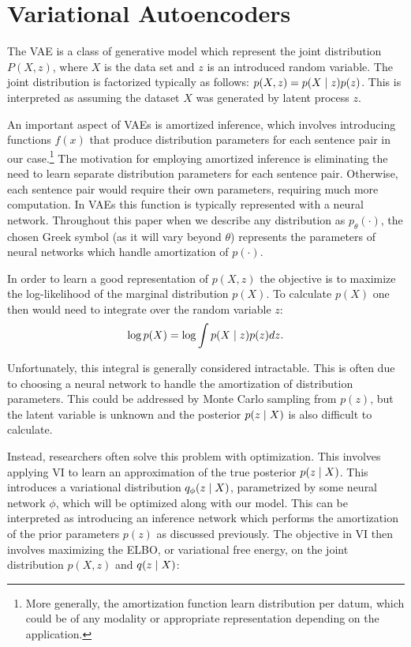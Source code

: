 \section{Variational Autoencoders}

The \ac{VAE} is a class of generative model which represent the joint distribution $P(X, z)$, where $X$ is the data set and $z$ is an introduced random variable. The joint distribution is factorized typically as follows: $p(X, z) = p(X\; | \;{z})p(z)$. This is interpreted as assuming the dataset $X$ was generated by latent process  $z$. 

An important aspect of \ac{VAE}s is amortized inference, which involves introducing functions $f(x)$ that produce distribution parameters for each sentence pair in our case.\footnote{More generally, the amortization function learn distribution per datum, which could be of any modality or appropriate representation depending on the application.} The motivation for employing amortized inference is eliminating the need to learn separate distribution parameters for each sentence pair. Otherwise, each sentence pair would require their own parameters, requiring much more computation. In \ac{VAE}s this function is typically represented with a neural network. Throughout this paper when we describe any distribution as $p_{\theta}(\cdot)$, the chosen Greek symbol (as it will vary beyond $\theta$) represents the parameters of neural networks which handle amortization of $p(\cdot)$. 

In order to learn a good representation of $p(X,z)$ the objective is to maximize the log-likelihood of the marginal distribution $p(X)$. To calculate $p(X)$ one then would need to integrate over the random variable $z$:
\begin{equation}
\log p(X) = \log \int p(X \; | \;{z}) p(z) dz.
\end{equation}

Unfortunately, this integral is generally considered intractable. This is often due to choosing a neural network to handle the amortization of distribution parameters. This could be addressed by Monte Carlo sampling from $p(z)$, but the latent variable is unknown and the posterior $p(z \; | \;{X})$ is also difficult to calculate. 

Instead, researchers often solve this problem with optimization. This involves applying \ac{VI} to learn an approximation of the true posterior $p(z \; | \;{X})$. This introduces a variational distribution $q_{\phi}(z \; | \;{X})$, parametrized by some neural network $\phi$, which will be optimized along with our model. This can be interpreted as introducing an inference network which performs the amortization of the prior parameters $p(z)$ as discussed previously. The objective in \ac{VI} then involves maximizing the \ac{ELBO}, or variational free energy, on the joint distribution $p(X, z)$ and $q(z \; | \;{X})$: 

